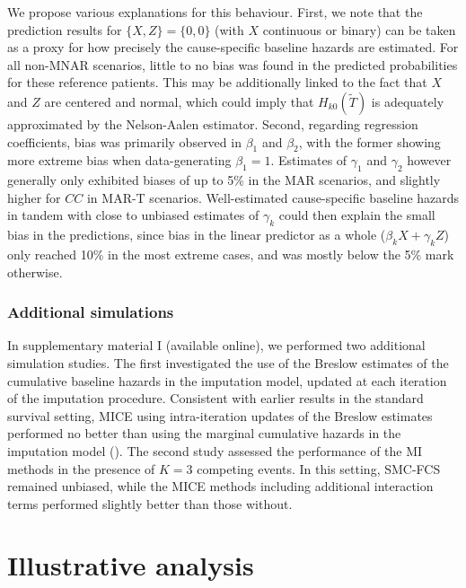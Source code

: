\documentclass[
  letterpaper,
  DIV=11,
  numbers=noendperiod]{scrreprt}
\begin{document}
We propose various explanations for this behaviour. First, we note that
the prediction results for \(\{X,Z\} = \{0, 0\}\) (with \(X\) continuous
or binary) can be taken as a proxy for how precisely the cause-specific
baseline hazards are estimated. For all non-MNAR scenarios, little to no
bias was found in the predicted probabilities for these reference
patients. This may be additionally linked to the fact that \(X\) and
\(Z\) are centered and normal, which could imply that
\(H_{k0}(\tilde{T})\) is adequately approximated by the Nelson-Aalen
estimator. Second, regarding regression coefficients, bias was primarily
observed in \(\beta_1\) and \(\beta_2\), with the former showing more
extreme bias when data-generating \(\beta_1 = 1\). Estimates of
\(\gamma_1\) and \(\gamma_2\) however generally only exhibited biases of
up to 5\% in the MAR scenarios, and slightly higher for \(CC\) in MAR-T
scenarios. Well-estimated cause-specific baseline hazards in tandem with
close to unbiased estimates of \(\gamma_k\) could then explain the small
bias in the predictions, since bias in the linear predictor as a whole
(\(\beta_k X + \gamma_k Z\)) only reached 10\% in the most extreme
cases, and was mostly below the 5\% mark otherwise.

\subsubsection{Additional simulations}\label{additional-simulations}

In supplementary material I (available online), we performed two
additional simulation studies. The first investigated the use of the
Breslow estimates of the cumulative baseline hazards in the imputation
model, updated at each iteration of the imputation procedure. Consistent
with earlier results in the standard survival setting, MICE using
intra-iteration updates of the Breslow estimates performed no better
than using the marginal cumulative hazards in the imputation model
(). The second study assessed the performance of the MI methods in
the presence of \(K = 3\) competing events. In this setting, SMC-FCS
remained unbiased, while the MICE methods including additional
interaction terms performed slightly better than those without.

\section{Illustrative analysis}\label{sec-illust-analysis}
\end{document}
